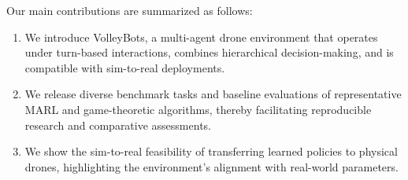Our main contributions are summarized as follows:
\begin{enumerate}
    \item We introduce VolleyBots, a multi-agent drone environment that operates under turn-based interactions, combines hierarchical decision-making, and is compatible with sim-to-real deployments.
    \item We release diverse benchmark tasks and baseline evaluations of representative MARL and game-theoretic algorithms, thereby facilitating reproducible research and comparative assessments.
    \item We show the sim-to-real feasibility of transferring learned policies to physical drones, highlighting the environment’s alignment with real-world parameters.
\end{enumerate}



